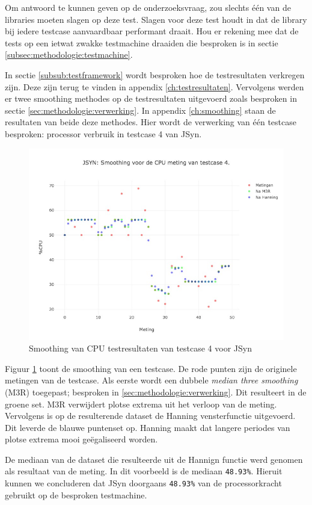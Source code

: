 Om antwoord te kunnen geven op de onderzoeksvraag, zou slechts één van de libraries moeten slagen op deze test. Slagen voor deze test houdt in dat de library bij iedere testcase aanvaardbaar performant draait. Hou er rekening mee dat de tests op een ietwat zwakke testmachine draaiden die besproken is in sectie \ref{subsec:methodologie:testmachine}.

In sectie \ref{subsub:testframework} wordt besproken hoe de testresultaten verkregen zijn. Deze zijn terug te vinden in appendix \ref{ch:testresultaten}. Vervolgens werden er twee smoothing methodes op de testresultaten uitgevoerd zoals besproken in sectie \ref{sec:methodologie:verwerking}. In appendix \ref{ch:smoothing} staan de resultaten van beide deze methodes. Hier wordt de verwerking van één testcase besproken: processor verbruik in testcase 4 van JSyn.

\begin{figure}
    		\centering
    		\includegraphics[width=0.75\linewidth]{medians/jsyn_cpu_4}
    		\caption{Smoothing van CPU testresultaten van testcase 4  voor JSyn}
    		\label{jsyn_cpu_4}
\end{figure}

Figuur \ref{jsyn_cpu_4} toont de smoothing van een testcase. De rode punten zijn de originele metingen van de testcase. Als eerste wordt een dubbele \textit{median three smoothing} (M3R) toegepast; besproken in \ref{sec:methodologie:verwerking}. Dit resulteert in de groene set. M3R verwijdert plotse extrema uit het verloop van de meting. Vervolgens is op de resulterende dataset de Hanning vensterfunctie uitgevoerd. Dit leverde de blauwe puntenset op. Hanning maakt dat langere periodes van plotse extrema mooi geëgaliseerd worden.

De mediaan van de dataset die resulteerde uit de Hannign functie werd genomen als resultaat van de meting. In dit voorbeeld is de mediaan \verb+48.93%+. Hieruit kunnen we concluderen dat JSyn doorgaans \verb+48.93%+ van de processorkracht gebruikt op de besproken testmachine.

